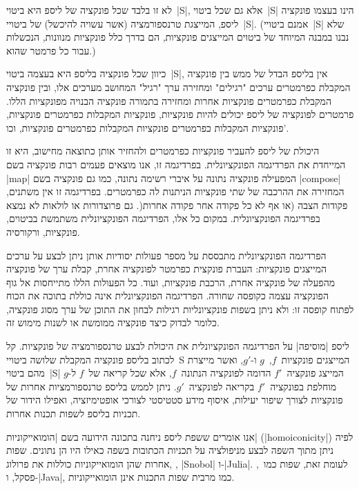 לא זו בלבד שכל פונקציה של ליספ היא ביטוי~\E|S|, אלא גם שכל ביטוי~\E|S| הינו
בעצמו פונקציה ליספ, המייצגת טרנספורמציה (אשר עשויה להיכשל) של ביטויי~\E|S|.
(אמנם ביטויי~\E|S| שלא נבנו במבנה המיוחד של ביטוים המייצגים פונקציות, הם בדרך
כלל פונקציות מנוונות, הנכשלות עבור כל פרמטר שהוא.)

כיוון שכל פונקציה בליספ היא בעצמה ביטוי~\E|S|, אין בליספ הבדל של ממש בין
פונקציה המקבלת כפרמטרים ערכים "רגילים" ומחזירה ערך "רגיל" המחושב מערכים אלו,
ובין פונקציה המקבלת כפרמטרים פונקציות אחרות ומחזירה בתמורה פונקציה הבנויה
מפונקציות הללו. פרמטרים לפונקציה של ליספ יכולים להיות פונקציות, פונקציות
המקבלות כפרמטרים פונקציות, פונקציות המקבלות כפרמטרים פונקציות המקבלות כפרמטרים
פונקציות, וכו'.

היכולת של ליספ להעביר פונקציות כפרמטרים ולהחזיר אותן כתוצאה מחישוב, היא זו
המייחדת את הפרדיגמה הפונקציונלית. בפרדיגמה זו, אנו מוצאים פעמים רבות פונקציה
בשם \E|map| המפעילה פונקציה נתונה על איברי רשימה נתונה, כמו גם פונקציה בשם
\E|compose| המחזירה את ההרכבה של שתי פונקציות הניתנות לה כפרמטרים. בפרדיגמה זו
אין משתנים, פקודות הצבה (או אף לא כל פקודה אחר פקודה אחרות(. גם פרוצדורות או
לולאות לא נמצא בפרדיגמה הפונקציונלית. במקום כל אלו, הפרדיגמה הפונקציונלית
משתמשת בביטוים, פונקציות, ורקורסיה.

הפרדיגמה הפונקציונלית מתבססת על מספר פעולות יסודיות אותן ניתן לבצע על ערכים
המייצגים פונקציות: העברת פונקצית כפרמטר לפונקציה אחרת, קבלת ערך של פונקציה
מהפעלה של פונקציה אחרת, הרכבת פונקציות, ועוד. כל הפעולות הללו מתייחסות אל גוף
הפונקציה עצמה כקופסה שחורה. הפרדיגמה הפונקציונלית אינה כוללת בתוכה את הכוח
לפתוח קופסה זו: ולא ניתן בשפות פונקציונליות רגילות לבחון את התוכן של ערך מסוג
פונקציה, כלומר לבדוק כיצד פונקציה ממומשת או לשנות מימוש זה.

ליספ \ע|מוסיפה| על הפרדיגמה הפונקציונלית את היכולת לבצע טרנספורמציה של
פונקציות. קל לכתוב בליספ פונקציה המקבלת שלושה ביטויי~S המייצגים
פונקציות~$f$,~$g$ ו-$g'$, ואשר מייצרת מהם ביטוי~\E|S| המייצג פונקציה~$f'$ הדומה
לפונקציה הנתונה~$f$, אלא שכל קריאה של~$f$ ל-$g$ מוחלפת בפונקציה~$f'$ בקריאה
לפונקציה~$g'$. ניתן לממש בליספ טרנספורמציות אחרות של פונקציות לצורך שיפור
יעילות, איסוף מידע סטטיסטי לצורכי אופטימיזציה, ואפילו הידור של תכניות בליספ
לשפות תכנות אחרות.

אנו אומרים ששפת ליספ ניחנה בתכונה הידועה בשם \ע|הומואייקוניות|
(\E|homoiconicity|) לפיה ניתן מתוך השפה לבצע מניפולציה על תכניות הכתובות בשפה
כאילו היו הן נתונים. שפות אחרות שהן הומואייקוניות כוללות את פרולוג, , \E|Snobol| ו-\E|Julia|. לעומת זאת, שפות כמו~\CPL, פסקל,
ו-\E|Java|, כמו מרבית שפות התכנות אינן הומואייקוניות.

